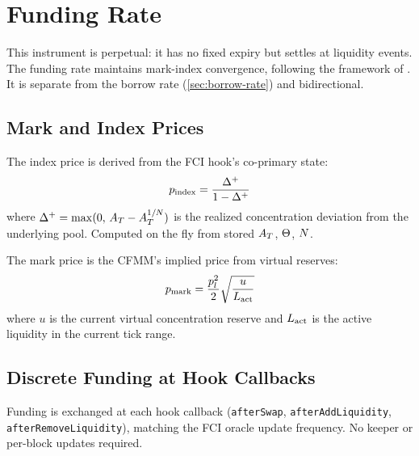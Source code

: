 
\section{Funding Rate}\label{sec:funding-rate}

This instrument is perpetual: it has no fixed expiry but settles at liquidity events.
The funding rate maintains mark-index convergence, following the framework of
\cite{angeris2022perpetuals}. It is separate from the borrow rate
(\cref{sec:borrow-rate}) and bidirectional.

\subsection{Mark and Index Prices}

\begin{definition}\label{def:index-price}
The index price is derived from the FCI hook's co-primary state:
\begin{equation}\label{eq:index-price}
  p_{\text{index}} = \frac{\Delta^{+}}{1 - \Delta^{+}}
\end{equation}
where $\Delta^{+} = \max(0,\, A_T - A_T^{1/N})$ is the realized concentration deviation
from the underlying pool. Computed on the fly from stored $A_T$, $\Theta$, $N$.
\end{definition}

\begin{definition}\label{def:mark-price}
The mark price is the CFMM's implied price from virtual reserves:
\begin{equation}\label{eq:mark-price}
  p_{\text{mark}} = \frac{p_l^2}{2}\sqrt{\frac{u}{L_{\text{act}}}}
\end{equation}
where $u$ is the current virtual concentration reserve and $L_{\text{act}}$ is
the active liquidity in the current tick range.
\end{definition}

\subsection{Discrete Funding at Hook Callbacks}

Funding is exchanged at each hook callback (\texttt{afterSwap},
\texttt{afterAddLiquidity}, \texttt{afterRemoveLiquidity}), matching
the FCI oracle update frequency. No keeper or per-block updates required.


